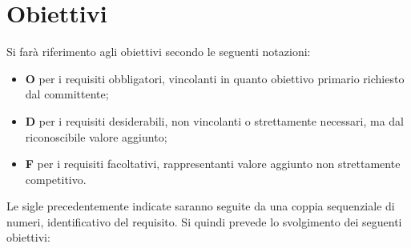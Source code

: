 \section{Obiettivi}

Si farà riferimento agli obiettivi secondo le seguenti notazioni:

\begin{itemize}
    \item \textbf{O} per i requisiti obbligatori, vincolanti in quanto obiettivo primario richiesto dal committente;
    \item \textbf{D} per i requisiti desiderabili, non vincolanti o strettamente necessari, ma dal riconoscibile valore aggiunto;
    \item \textbf{F} per i requisiti facoltativi, rappresentanti valore aggiunto non strettamente competitivo.
\end{itemize}

Le sigle precedentemente indicate saranno seguite da una coppia sequenziale di numeri, identificativo del requisito. Si quindi prevede lo svolgimento dei seguenti obiettivi:

